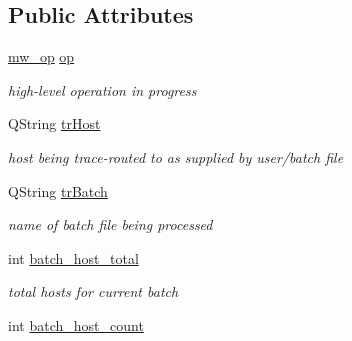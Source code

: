 \subsection*{Public Attributes}
\begin{CompactItemize}
\item 
\hypertarget{classPStatus_140a3641f74f0eaf753ad357695407d6}{
\hyperlink{classPStatus_12bddf7bbeab6dfb53ae018c4f2939fd}{mw\_\-op} \hyperlink{classPStatus_140a3641f74f0eaf753ad357695407d6}{op}}
\label{classPStatus_140a3641f74f0eaf753ad357695407d6}

\begin{CompactList}\small\item\em high-level operation in progress \item\end{CompactList}\item 
\hypertarget{classPStatus_e4ae091e268903577ba875d459acc128}{
QString \hyperlink{classPStatus_e4ae091e268903577ba875d459acc128}{trHost}}
\label{classPStatus_e4ae091e268903577ba875d459acc128}

\begin{CompactList}\small\item\em host being trace-routed to as supplied by user/batch file \item\end{CompactList}\item 
\hypertarget{classPStatus_3fa2f3e097f6a392177841b5243bb516}{
QString \hyperlink{classPStatus_3fa2f3e097f6a392177841b5243bb516}{trBatch}}
\label{classPStatus_3fa2f3e097f6a392177841b5243bb516}

\begin{CompactList}\small\item\em name of batch file being processed \item\end{CompactList}\item 
\hypertarget{classPStatus_affe0d729cafa713eda34de1c3e7d584}{
int \hyperlink{classPStatus_affe0d729cafa713eda34de1c3e7d584}{batch\_\-host\_\-total}}
\label{classPStatus_affe0d729cafa713eda34de1c3e7d584}

\begin{CompactList}\small\item\em total hosts for current batch \item\end{CompactList}\item 
\hypertarget{classPStatus_012924368b8372d113d211d66ac448a6}{
int \hyperlink{classPStatus_012924368b8372d113d211d66ac448a6}{batch\_\-host\_\-count}}
\label{classPStatus_012924368b8372d113d211d66ac448a6}


\end{CompactItemize}
